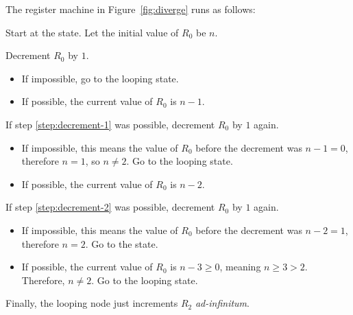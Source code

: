 \begin{problem}
\begin{answer}
    The register machine in Figure~\ref*{fig:diverge} runs as follows:
    \begin{enumarabic}
      \item Start at the  state. Let the initial value of $R_0$ be $n$.
      \item Decrement $R_0$ by $1$.~\label{step:decrement-1}
        \begin{itemize}
          \item If impossible, go to the looping state.
          \item If possible, the current value of $R_0$ is $n - 1$.
        \end{itemize}
      \item If step \ref{step:decrement-1} was possible, decrement $R_0$ by $1$ again.~\label{step:decrement-2}
        \begin{itemize}
          \item If impossible, this means the value of $R_0$ before the decrement was $n - 1 = 0$, therefore $n = 1$,
            so $n \neq 2$. Go to the looping state.
          \item If possible, the current value of $R_0$ is $n - 2$.
        \end{itemize}
      \item If step \ref{step:decrement-2} was possible, decrement $R_0$ by $1$ again.~\label{step:decrement-3}
        \begin{itemize}
          \item If impossible, this means the value of $R_0$ before the decrement was $n - 2 = 1$, therefore $n = 2$.
            Go to the  state.
          \item If possible, the current value of $R_0$ is $n - 3 \geq 0$, meaning $n \geq 3 > 2$.
            Therefore, $n \neq 2$. Go to the looping state.
        \end{itemize}
      \item Finally, the looping node just increments $R_2$ \emph{ad-infinitum}.
    \end{enumarabic}
  \end{answer}
\end{problem}
